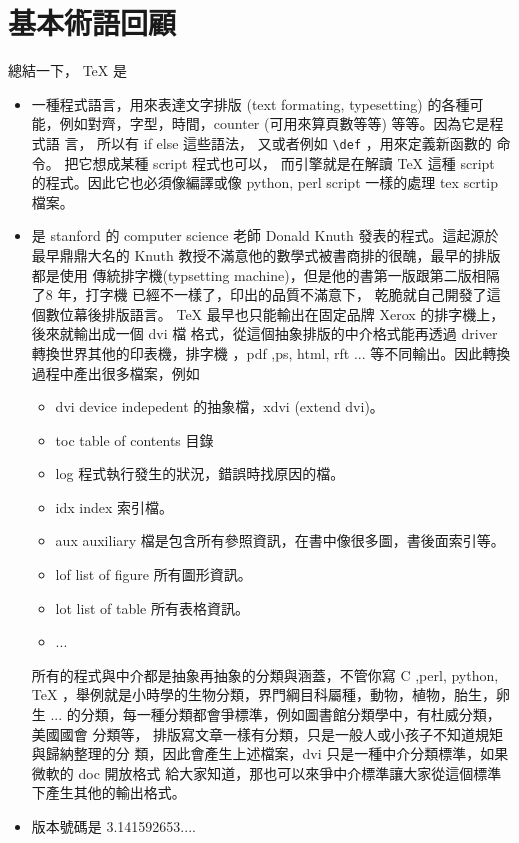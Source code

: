 \section{基本術語回顧}
總結一下， \TeX{} 是
\begin{itemize}
  \item 一種程式語言，用來表達文字排版 (text formating, typesetting) 的各種可
    能，例如對齊，字型，時間，counter (可用來算頁數等等) 等等。因為它是程式語
    言， 所以有 if else 這些語法， 又或者例如 \verb=\def= ，用來定義新函數的
    命令。 把它想成某種 script 程式也可以， 而引擎就是在解讀 \TeX{} 這種 script
    的程式。因此它也必須像編譯或像 python, perl script 一樣的處理 tex scrtip 
    檔案。
  \item 是 stanford 的 computer science 老師 Donald Knuth 發表的程式。這起源於
    最早鼎鼎大名的 Knuth 教授不滿意他的數學式被書商排的很醜，最早的排版都是使用
    傳統排字機(typsetting machine)，但是他的書第一版跟第二版相隔了8 年，打字機
    已經不一樣了，印出的品質不滿意下， 乾脆就自己開發了這個數位幕後排版語言。
    \TeX{} 最早也只能輸出在固定品牌 Xerox 的排字機上，後來就輸出成一個 dvi 檔
    格式，從這個抽象排版的中介格式能再透過 driver 轉換世界其他的印表機，排字機
    ，pdf ,ps, html, rft ... 等不同輸出。因此轉換過程中產出很多檔案，例如
    \begin{itemize}
      \item dvi device indepedent 的抽象檔，xdvi (extend dvi)。
      \item toc table of contents 目錄
      \item log 程式執行發生的狀況，錯誤時找原因的檔。
      \item idx index 索引檔。
      \item aux auxiliary 檔是包含所有參照資訊，在書中像很多圖，書後面索引等。
      \item lof list of figure 所有圖形資訊。
      \item lot list of table 所有表格資訊。
      \item ...
    \end{itemize}
    所有的程式與中介都是抽象再抽象的分類與涵蓋，不管你寫 C ,perl, python,
    \TeX{} ，舉例就是小時學的生物分類，界門綱目科屬種，動物，植物，胎生，卵生
    ... 的分類，每一種分類都會爭標準，例如圖書館分類學中，有杜威分類，美國國會
    分類等， 排版寫文章一樣有分類，只是一般人或小孩子不知道規矩與歸納整理的分
    類，因此會產生上述檔案，dvi 只是一種中介分類標準，如果微軟的 doc 開放格式
    給大家知道，那也可以來爭中介標準讓大家從這個標準下產生其他的輸出格式。
  \item 版本號碼是 3.141592653....

\end{itemize}
